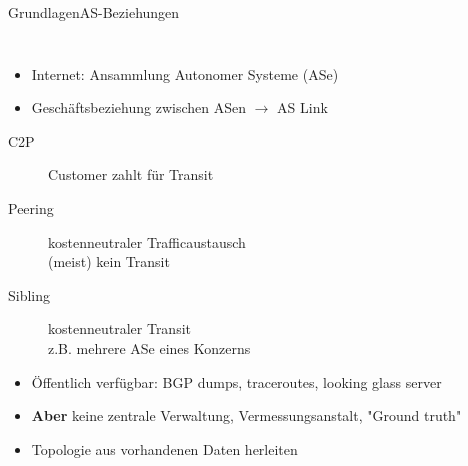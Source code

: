 \documentclass[ngerman,compress,hyperref={bookmarks}]{beamer}
\begin{document}
\begin{frame}[allowframebreaks]{Grundlagen}{AS-Beziehungen}
\begin{columns}[c]
\begin{column}{0.25\textwidth}
\begin{figure}
      \end{figure}
    \end{column}
  \end{columns}



\framebreak
  \begin{columns}[c]
    \begin{column}{0.75\textwidth}
      \begin{itemize}
        \item Internet: Ansammlung Autonomer Systeme (ASe)
        \item Geschäftsbeziehung zwischen ASen $\rightarrow$ AS Link
      \end{itemize}
      \begin{description}
        \item[C2P] Customer zahlt für Transit
        \item[Peering] kostenneutraler Trafficaustausch\\{\scriptsize(meist) kein Transit}
        \item[Sibling] kostenneutraler Transit\\{\scriptsize z.B. mehrere ASe eines Konzerns}
      \end{description}
      \begin{itemize}
        \item Öffentlich verfügbar: BGP dumps, traceroutes, looking glass server
        \item \textbf{Aber} keine zentrale Verwaltung, Vermessungsanstalt, "Ground truth"
        \item Topologie aus vorhandenen Daten herleiten
      \end{itemize}
    \end{column}
  \end{columns}
\end{frame}
\end{document}
